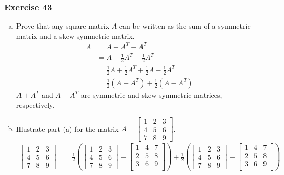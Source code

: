 \documentclass[letterpaper, 12pt]{math}
\begin{document}
\subsubsection*{Exercise 43}
\begin{enumerate}[(a)]
  \item Prove that any square matrix \( A \) can be written as the sum of a
  symmetric matrix and a skew-symmetric matrix.
  \begin{align*}
    A &= A+A^T-A^T \\
    &= A+\frac{1}{2}A^T-\frac{1}{2}A^T \\
    &= \frac{1}{2}A+\frac{1}{2}A^T+\frac{1}{2}A-\frac{1}{2}A^T \\
    &= \frac{1}{2}(A+A^T)+\frac{1}{2}(A-A^T)
  \end{align*}
  \( A+A^T \) and \( A-A^T \) are symmetric and skew-symmetric matrices,
  respectively.
  \item Illustrate part (a) for the matrix \( A = \begin{bmatrix}1 & 2 & 3 \\
  4 & 5 & 6 \\ 7 & 8 & 9\end{bmatrix} \).
  \begin{align*}
    \begin{bmatrix}
      1 & 2 & 3 \\
      4 & 5 & 6 \\
      7 & 8 & 9
    \end{bmatrix} &= \frac{1}{2}\left(\begin{bmatrix}
      1 & 2 & 3 \\
      4 & 5 & 6 \\
      7 & 8 & 9
    \end{bmatrix}+\begin{bmatrix}
      1 & 4 & 7 \\
      2 & 5 & 8 \\
      3 & 6 & 9 \\
    \end{bmatrix}\right)+\frac{1}{2}\left(\begin{bmatrix}
      1 & 2 & 3 \\
      4 & 5 & 6 \\
      7 & 8 & 9
    \end{bmatrix}-\begin{bmatrix}
      1 & 4 & 7 \\
      2 & 5 & 8 \\
      3 & 6 & 9 \\
    \end{bmatrix}\right)
  \end{align*}
\end{enumerate}
\end{document}
